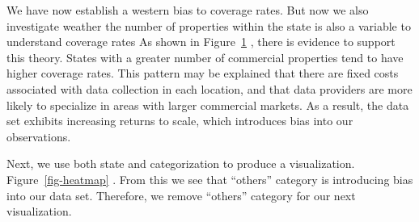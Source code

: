 \documentclass[
  12pt]{article}
\begin{document}
We have now establish a western bias to coverage rates. But now we also
investigate weather the number of properties within the state is also a
variable to understand coverage rates As shown in
Figure~\ref{fig-regress} , there is evidence to support this theory.
States with a greater number of commercial properties tend to have
higher coverage rates. This pattern may be explained that there are
fixed costs associated with data collection in each location, and that
data providers are more likely to specialize in areas with larger
commercial markets. As a result, the data set exhibits increasing
returns to scale, which introduces bias into our observations.

\begin{figure}


\caption{\label{fig-regress}}

\end{figure}%

Next, we use both state and categorization to produce a visualization.
Figure~\ref{fig-heatmap} . From this we see that ``others'' category is
introducing bias into our data set. Therefore, we remove ``others''
category for our next visualization.
\end{document}
